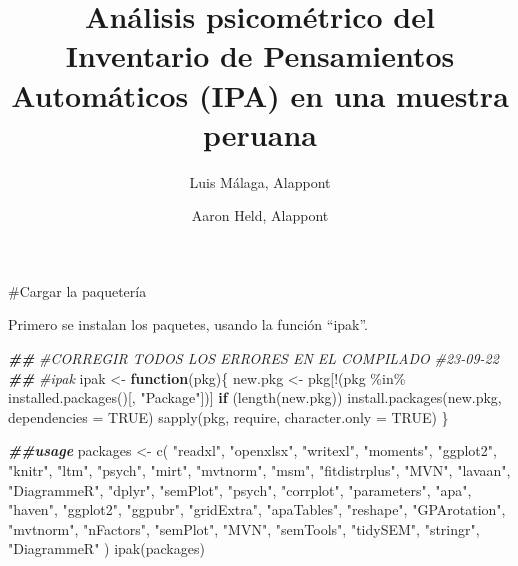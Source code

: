 \documentclass[
]{article}
\title{Análisis psicométrico del Inventario de Pensamientos Automáticos
(IPA) en una muestra peruana}
\author{Luis Málaga, Alappont \and Aaron Held, Alappont}
\date{}
\newenvironment{Shaded}{\begin{snugshade}}{\end{snugshade}}
\newcommand{\AttributeTok}[1]{\textcolor[rgb]{0.77,0.63,0.00}{#1}}
\newcommand{\CommentTok}[1]{\textcolor[rgb]{0.56,0.35,0.01}{\textit{#1}}}
\newcommand{\ConstantTok}[1]{\textcolor[rgb]{0.00,0.00,0.00}{#1}}
\newcommand{\ControlFlowTok}[1]{\textcolor[rgb]{0.13,0.29,0.53}{\textbf{#1}}}
\newcommand{\DocumentationTok}[1]{\textcolor[rgb]{0.56,0.35,0.01}{\textbf{\textit{#1}}}}
\newcommand{\FunctionTok}[1]{\textcolor[rgb]{0.00,0.00,0.00}{#1}}
\newcommand{\NormalTok}[1]{#1}
\newcommand{\OtherTok}[1]{\textcolor[rgb]{0.56,0.35,0.01}{#1}}
\newcommand{\SpecialCharTok}[1]{\textcolor[rgb]{0.00,0.00,0.00}{#1}}
\newcommand{\StringTok}[1]{\textcolor[rgb]{0.31,0.60,0.02}{#1}}
\begin{document}
\maketitle

\#Cargar la paquetería

Primero se instalan los paquetes, usando la función ``ipak''.

\begin{Shaded}
\begin{Highlighting}[]
\DocumentationTok{\#\#}
\CommentTok{\#CORREGIR TODOS LOS ERRORES EN EL COMPILADO}
\CommentTok{\#23{-}09{-}22}
\DocumentationTok{\#\#}
\CommentTok{\#ipak}
\NormalTok{ipak }\OtherTok{\textless{}{-}} \ControlFlowTok{function}\NormalTok{(pkg)\{}
\NormalTok{  new.pkg }\OtherTok{\textless{}{-}}\NormalTok{ pkg[}\SpecialCharTok{!}\NormalTok{(pkg }\SpecialCharTok{\%in\%} \FunctionTok{installed.packages}\NormalTok{()[, }\StringTok{"Package"}\NormalTok{])]}
  \ControlFlowTok{if}\NormalTok{ (}\FunctionTok{length}\NormalTok{(new.pkg)) }
    \FunctionTok{install.packages}\NormalTok{(new.pkg, }\AttributeTok{dependencies =} \ConstantTok{TRUE}\NormalTok{)}
  \FunctionTok{sapply}\NormalTok{(pkg, require, }\AttributeTok{character.only =} \ConstantTok{TRUE}\NormalTok{)}
\NormalTok{\}}

\DocumentationTok{\#\#usage}
\NormalTok{packages }\OtherTok{\textless{}{-}} \FunctionTok{c}\NormalTok{(}
  \StringTok{"readxl"}\NormalTok{,}
  \StringTok{"openxlsx"}\NormalTok{,}
  \StringTok{"writexl"}\NormalTok{,}
  \StringTok{"moments"}\NormalTok{,}
  \StringTok{"ggplot2"}\NormalTok{,}
  \StringTok{"knitr"}\NormalTok{,}
  \StringTok{"ltm"}\NormalTok{,}
  \StringTok{"psych"}\NormalTok{,}
  \StringTok{"mirt"}\NormalTok{,}
  \StringTok{"mvtnorm"}\NormalTok{,}
  \StringTok{"msm"}\NormalTok{,}
  \StringTok{"fitdistrplus"}\NormalTok{,}
  \StringTok{"MVN"}\NormalTok{,}
  \StringTok{"lavaan"}\NormalTok{,}
  \StringTok{"DiagrammeR"}\NormalTok{,}
  \StringTok{"dplyr"}\NormalTok{,}
  \StringTok{"semPlot"}\NormalTok{,}
  \StringTok{"psych"}\NormalTok{,}
  \StringTok{"corrplot"}\NormalTok{,}
  \StringTok{"parameters"}\NormalTok{,}
  \StringTok{"apa"}\NormalTok{,}
  \StringTok{"haven"}\NormalTok{,}
  \StringTok{"ggplot2"}\NormalTok{,}
  \StringTok{"ggpubr"}\NormalTok{,}
  \StringTok{"gridExtra"}\NormalTok{,}
  \StringTok{"apaTables"}\NormalTok{,}
  \StringTok{"reshape"}\NormalTok{,}
  \StringTok{"GPArotation"}\NormalTok{,}
  \StringTok{"mvtnorm"}\NormalTok{,}
  \StringTok{"nFactors"}\NormalTok{,}
  \StringTok{"semPlot"}\NormalTok{, }
  \StringTok{"MVN"}\NormalTok{,}
  \StringTok{"semTools"}\NormalTok{,}
  \StringTok{"tidySEM"}\NormalTok{,}
  \StringTok{"stringr"}\NormalTok{,}
  \StringTok{"DiagrammeR"}
\NormalTok{  )}
\FunctionTok{ipak}\NormalTok{(packages)}
\end{Highlighting}
\end{Shaded}
\end{document}
